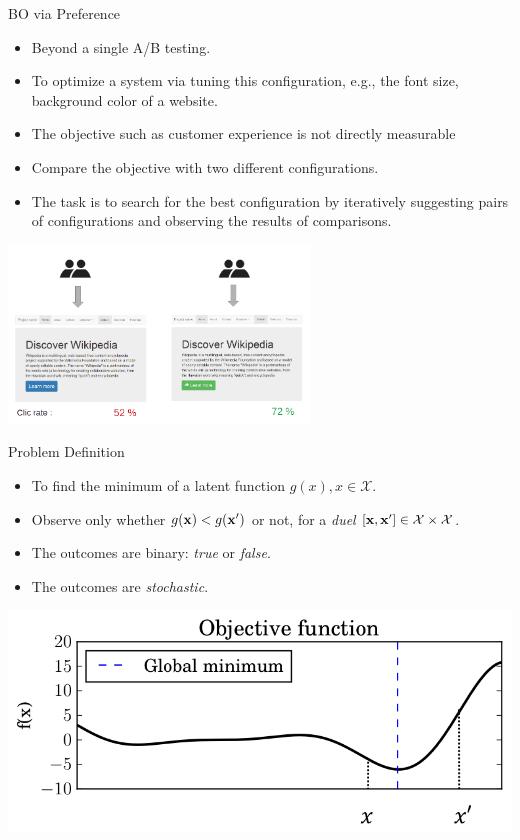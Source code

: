 \documentclass[13pt,aspectratio=1610]{beamer}
\begin{document}
\begin{frame}{BO via Preference}

\begin{itemize}
\item Beyond a single A/B testing.
\item To optimize a system via tuning this configuration, e.g., the font size, background color of a website.
\item The objective such as customer experience is not directly measurable
\item Compare the objective with two different configurations. 
\item The task is to search for the best configuration by iteratively suggesting pairs of configurations and observing the results of comparisons.
\end{itemize}
\centering
\vspace{-5mm}
\includegraphics[width=0.6\textwidth]{A-B_testing_simple_example.png}
\end{frame}


\begin{frame}{Problem Definition}
\begin{itemize}
\item To find the minimum of a latent function $g(x), x \in {\mathcal X}$.
\item Observe only whether $g({\bf x})<g({\bf x}')$ or not, for a \emph{duel} $[{\bf x},{\bf x}'] \in {\mathcal X} \times {\mathcal X}$.
\item The outcomes are binary: \emph{true} or \emph{false}.
\item The outcomes are \emph{stochastic}.
\end{itemize}

\centering 
\includegraphics[width=.6\textwidth]{forrester_xx.png}
\end{frame}
\end{document}
